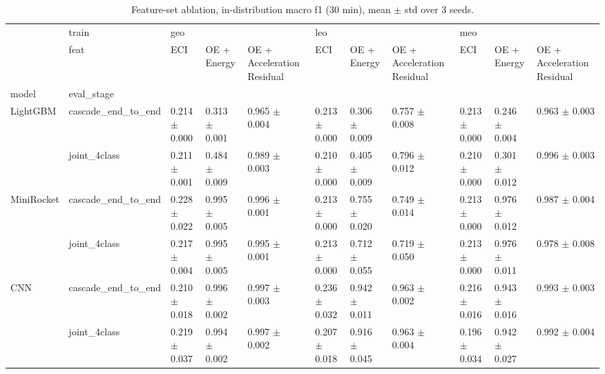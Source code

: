 \begin{table}
\centering
\caption{Feature-set ablation, in-distribution macro f1 (30 min), mean $\pm$ std over 3 seeds.}
\label{tab:feat_f1}
\begin{tabular}{lllllllllll}
\toprule
            & train & \multicolumn{3}{l}{geo} & \multicolumn{3}{l}{leo} & \multicolumn{3}{l}{meo} \\
            & feat &                ECI &        OE + Energy & OE + Acceleration Residual &                ECI &        OE + Energy & OE + Acceleration Residual &                ECI &        OE + Energy & OE + Acceleration Residual \\
model & eval_stage &                    &                    &                            &                    &                    &                            &                    &                    &                            \\
\midrule
LightGBM & cascade_end_to_end &  0.214 $\pm$ 0.000 &  0.313 $\pm$ 0.001 &          0.965 $\pm$ 0.004 &  0.213 $\pm$ 0.000 &  0.306 $\pm$ 0.009 &          0.757 $\pm$ 0.008 &  0.213 $\pm$ 0.000 &  0.246 $\pm$ 0.004 &          0.963 $\pm$ 0.003 \\
            & joint_4class &  0.211 $\pm$ 0.001 &  0.484 $\pm$ 0.009 &          0.989 $\pm$ 0.003 &  0.210 $\pm$ 0.000 &  0.405 $\pm$ 0.009 &          0.796 $\pm$ 0.012 &  0.210 $\pm$ 0.000 &  0.301 $\pm$ 0.012 &          0.996 $\pm$ 0.003 \\
MiniRocket & cascade_end_to_end &  0.228 $\pm$ 0.022 &  0.995 $\pm$ 0.005 &          0.996 $\pm$ 0.001 &  0.213 $\pm$ 0.000 &  0.755 $\pm$ 0.020 &          0.749 $\pm$ 0.014 &  0.213 $\pm$ 0.000 &  0.976 $\pm$ 0.012 &          0.987 $\pm$ 0.004 \\
            & joint_4class &  0.217 $\pm$ 0.004 &  0.995 $\pm$ 0.005 &          0.995 $\pm$ 0.001 &  0.213 $\pm$ 0.000 &  0.712 $\pm$ 0.055 &          0.719 $\pm$ 0.050 &  0.213 $\pm$ 0.000 &  0.976 $\pm$ 0.011 &          0.978 $\pm$ 0.008 \\
CNN & cascade_end_to_end &  0.210 $\pm$ 0.018 &  0.996 $\pm$ 0.002 &          0.997 $\pm$ 0.003 &  0.236 $\pm$ 0.032 &  0.942 $\pm$ 0.011 &          0.963 $\pm$ 0.002 &  0.216 $\pm$ 0.016 &  0.943 $\pm$ 0.016 &          0.993 $\pm$ 0.003 \\
            & joint_4class &  0.219 $\pm$ 0.037 &  0.994 $\pm$ 0.002 &          0.997 $\pm$ 0.002 &  0.207 $\pm$ 0.018 &  0.916 $\pm$ 0.045 &          0.963 $\pm$ 0.004 &  0.196 $\pm$ 0.034 &  0.942 $\pm$ 0.027 &          0.992 $\pm$ 0.004 \\

\end{tabular}
\end{table}
